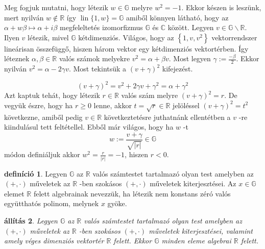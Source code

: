 \documentclass[9pt, a4paper, showtrims]{memoir}
\makeatletter
\renewenvironment{proof}[1][\proofname]
    {\par\pushQED{\qed}%
    \normalfont \topsep6\p@\@plus6\p@\relax
    \trivlist
    \item[\hskip\labelsep
        \itshape
    #1\@addpunct{:}]\ignorespaces}
    {\popQED\endtrivlist\@endpefalse}
\theoremstyle{plain}
\newtheorem{proposition}{állítás}[chapter]
\theoremstyle{remark}
\theoremstyle{definition}
\newtheorem{definition}[proposition]{definíció}
\DeclareMathOperator{\lin}{lin}
\makeatother
\begin{document}
\begin{proof}
	Meg fogjuk mutatni, hogy létezik $w\in \mathbb{G}$ melyre $w^{2}=-1$.
	Ekkor
	készen is leszünk, mert nyilván $w\notin \mathbb{R}$ így $\lin\{1,w\}=\mathbb{G}$ amiből könnyen látható, hogy
	az $\alpha +w\beta \longmapsto \alpha +i\beta $ megfeleltetés
	izomorfizmus $\mathbb{G}$ és $\mathbb{C}$ között.
	\newline
	Legyen $v\in \mathbb{G}\smallsetminus \mathbb{R}$.
	Ilyen $v$ létezik, mivel $\mathbb{G}
	$ kétdimenziós.
	Világos, hogy az $\left\{
		1,v,v^{2}\right\} $ vektorrendszer lineárisan összefüggő,
	hiszen három vektor egy kétdimenziós vektortérben.
	\'{I}gy léteznek $\alpha ,\beta \in \mathbb{R}$ valós számok melyekre $v^{2}=\alpha +\beta v$.
	Most legyen $\gamma :=\frac{-\beta }{2}
	$.
	Ekkor nyilván $v^{2}=\alpha -2\gamma v$.
	Most tekintsük a $\left(
		v+\gamma \right) ^{2}$ kifejezést.

	\[
		\left( v+\gamma \right) ^{2}=v^{2}+2\gamma v+\gamma ^{2}=\alpha +\gamma ^{2}
	\]
	Azt kaptuk tehát, hogy létezik $r\in \mathbb{R}$ valós szám
	melyre $\left( v+\gamma \right) ^{2}=r$.
	De vegyük észre, hogy ha $r\geq 0$ lenne,
	akkor $t=\sqrt{r}\in\mathbb{R}$
	jelöléssel $\left( v+\gamma \right)^2=t^2$ következne, amiből pedig $v\in \mathbb{R}$ következtetésre juthatnánk ellentétben a $v$ -re kiindulásul tett feltétellel.
	Ebből már
	világos, hogy ha $w$ -t
	\[
		w:=\frac{v+\gamma }{\sqrt{\left| r\right| }}\in \mathbb{G}
	\]
	módon definiáljuk akkor $w^{2}=\frac{r}{\left| r\right| }=-1$,
	hiszen $r<0$.
\end{proof}

\begin{definition}
	Legyen $\mathbb{G}$ az $\mathbb{R}$ valós számtestet tartalmazó olyan
	test amelyben az $\left( +,\cdot \right) $ műveletek az $\mathbb{R}$ -ben
	szokásos $\left( +,\cdot \right) $ műveletek kiterjesztései.
	Az $x\in \mathbb{G}$ elemet $\mathbb{R}$ felett algebrainak nevezzük, ha létezik nem konstans zéró valós együtthatós polinom,
	melynek $x$ gyöke.
\end{definition}

\begin{proposition}
	Legyen $\mathbb{G}$ az $\mathbb{R}$ valós számtestet tartalmazó olyan
	test amelyben az $\left( +,\cdot \right) $ műveletek az $\mathbb{R}$ -ben
	szokásos $\left( +,\cdot \right) $ műveletek kiterjesztései,
	valamint amely véges dimenziós vektortér $\mathbb{R}$ felett.
	Ekkor $\mathbb{G}$ minden eleme algebrai $\mathbb{R}$ felett.
\end{proposition}
\end{document}
